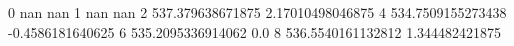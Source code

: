 0 nan nan
1 nan nan
2 537.379638671875 2.17010498046875
4 534.7509155273438 -0.4586181640625
6 535.2095336914062 0.0
8 536.5540161132812 1.344482421875
